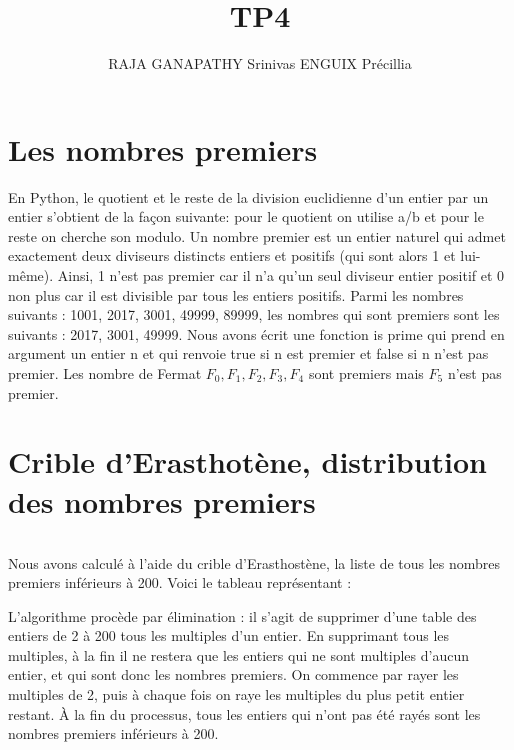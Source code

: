 \documentclass{article}
\title{TP4}
\author{RAJA GANAPATHY Srinivas ENGUIX Précillia}
\begin{document}
\maketitle


\section{Les nombres premiers}
$$ $$
En Python, le quotient et le reste de la division euclidienne d'un entier par un entier s'obtient de la façon suivante: pour le quotient on utilise a/b et pour le reste on cherche son modulo.
Un nombre premier est un entier naturel qui admet exactement deux diviseurs distincts entiers et positifs (qui sont alors 1 et lui-même). Ainsi, 1 n'est pas premier car il n'a qu'un seul diviseur entier positif et 0 non plus car il est divisible par tous les entiers positifs.
\newline
Parmi les nombres suivants : 1001, 2017, 3001, 49999, 89999, les nombres qui sont premiers sont les suivants : 2017, 3001, 49999. 
\newline
Nous avons écrit une fonction is prime qui prend en argument un entier n et qui renvoie true si n est premier et false si n n'est pas premier.
Les nombre de Fermat $F_0,F_1,F_2,F_3,F_4$ sont premiers mais $F_5$ n'est pas premier. 
$$ $$
     
\section{Crible d'Erasthotène, distribution des nombres premiers}
$$ $$

Nous avons calculé à l'aide du crible d'Erasthostène, la liste de tous les nombres premiers inférieurs à 200. Voici le tableau représentant :


\newline
\newline
\newline

L'algorithme procède par élimination : il s'agit de supprimer d'une table des entiers de 2 à 200 tous les multiples d'un entier. En supprimant tous les multiples, à la fin il ne restera que les entiers qui ne sont multiples d'aucun entier, et qui sont donc les nombres premiers. On commence par rayer les multiples de 2, puis à chaque fois on raye les multiples du plus petit entier restant. À la fin du processus, tous les entiers qui n'ont pas été rayés sont les nombres premiers inférieurs à 200.
\newline
\newline
\end{document}

